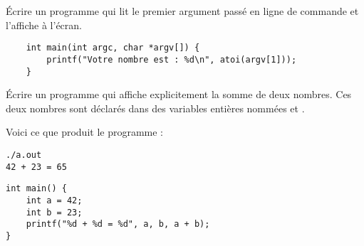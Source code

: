 \documentclass[french,a4paper,addpoints,11pt,answers]{exam}
\begin{document}
\begin{questions}

\question Écrire un programme qui lit le premier argument passé en ligne de commande et l'affiche à l'écran.

\ifprintanswers
\begin{solution}
    \begin{lstlisting}
    int main(int argc, char *argv[]) {
        printf("Votre nombre est : %d\n", atoi(argv[1]));
    }
    \end{lstlisting}
\end{solution}
\else
\fillwithdottedlines{4cm}
\fi

\question Écrire un programme qui affiche explicitement la somme de deux nombres. 
Ces deux nombres sont déclarés dans des variables entières nommées  et . 

Voici ce que produit le programme :

\begin{lstlisting}
./a.out 
42 + 23 = 65
\end{lstlisting}

\ifprintanswers
\begin{solution}
\begin{lstlisting}
int main() {
    int a = 42;
    int b = 23;
    printf("%d + %d = %d", a, b, a + b);
}
\end{lstlisting}
\end{solution}
\else
\fillwithdottedlines{4cm}
\fi

\end{questions}
\end{document}
